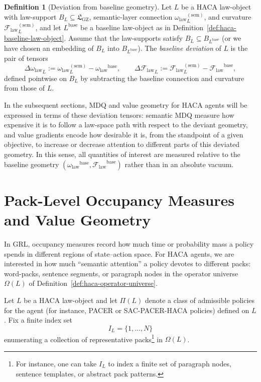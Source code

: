\documentclass[11pt]{book}
\theoremstyle{plain}
\theoremstyle{definition}
\newtheorem{definition}[theorem]{Definition}
\theoremstyle{remark}
\newcommand{\GZLS}{\ensuremath{\mathfrak{L}_{\mathrm{GZ}}}}       \newcommand{\GZLT}{\ensuremath{M_{!w}}}                           \newcommand{\GZLOC}{\ensuremath{A_M}}                             \newcommand{\GZLC}{\ensuremath{\omega_{\mathrm{law}}}}            \newcommand{\GZLCurv}{\ensuremath{\mathcal{F}_{\mathrm{law}}}}
\begin{document}
\begin{definition}[Deviation from baseline geometry]
\label{def:baseline-deviation}
Let $L$ be a HACA law-object with law-support $B_L\subseteq\GZLS$,
semantic-layer connection ${\GZLC}_L^{(\mathrm{sem})}$, and curvature
${\GZLCurv}_L^{(\mathrm{sem})}$, and let $L^{\mathrm{base}}$ be a
baseline law-object as in
Definition~\ref{def:haca-baseline-law-object}. Assume that the
law-supports satisfy $B_L\subseteq B_{L^{\mathrm{base}}}$ (or we have
chosen an embedding of $B_L$ into $B_{L^{\mathrm{base}}}$). The
\emph{baseline deviation} of $L$ is the pair of tensors
\[
  \Delta{\GZLC}_L
  :=
  {\GZLC}_L^{(\mathrm{sem})} - \GZLC^{\mathrm{base}},
  \qquad
  \Delta{\GZLCurv}_L
  :=
  {\GZLCurv}_L^{(\mathrm{sem})} - \GZLCurv^{\mathrm{base}},
\]
defined pointwise on $B_L$ by subtracting the baseline connection and
curvature from those of $L$.
\end{definition}

In the subsequent sections, MDQ and value geometry for HACA agents will
be expressed in terms of these deviation tensors: semantic MDQ measure
how expensive it is to follow a law-space path with respect to the
deviant geometry, and value gradients encode how desirable it is, from
the standpoint of a given objective, to increase or decrease attention
to different parts of this deviated geometry. In this sense, all
quantities of interest are measured relative to the baseline geometry
$(\GZLC^{\mathrm{base}},\GZLCurv^{\mathrm{base}})$ rather than in an
absolute vacuum.

\section[Pack-Level Occupancy Measures and Value Geometry]{Pack-Level Occupancy Measures and Value Geometry}


In GRL, occupancy measures record how much time or probability mass a
policy spends in different regions of state–action space. For HACA
agents, we are interested in how much ``semantic attention'' a policy
devotes to different packs: word-packs, sentence segments, or paragraph
nodes in the operator universe $\Omega(L)$ of
Definition~\ref{def:haca-operator-universe}.

Let $L$ be a HACA law-object and let $\Pi(L)$ denote a class of
admissible policies for the agent (for instance, PACER or
SAC-PACER-HACA policies) defined on $L$. Fix a finite index set
\[
  I_L = \{1,\dots,N\}
\]
enumerating a collection of representative packs\footnote{For instance,
one can take $I_L$ to index a finite set of paragraph nodes, sentence
templates, or abstract pack patterns.} in $\Omega(L)$.
\end{document}
